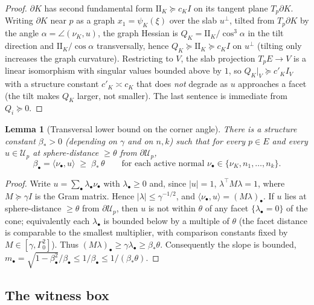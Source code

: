 \documentclass[11pt]{article}
\newtheorem{lemma}[theorem]{Lemma}
\begin{document}
\begin{proof}
$\partial K$ has second fundamental form $\mathrm{I\!I}_K\succeq c_K I$ on its
tangent plane $T_p\partial K$.  Writing $\partial K$ near $p$ as a graph
$x_1=\psi_K(\xi)$ over the slab $u^\perp$, tilted from $T_p\partial K$ by the
angle $\alpha=\angle(\nu_K,u)$, the graph Hessian is
$Q_K=\mathrm{I\!I}_K/\cos^3\!\alpha$ in the tilt direction and
$\mathrm{I\!I}_K/\cos\alpha$ transversally, hence $Q_K\succeq\mathrm{I\!I}_K
\succeq c_K I$ on $u^\perp$ (tilting only increases the graph curvature).
Restricting to $V$, the slab projection $T_pE\to V$ is a linear isomorphism with
singular values bounded above by $1$, so $Q_K|_V\succeq c'_K I_V$ with a
structure constant $c'_K\asymp c_K$ that does \emph{not} degrade as $u$
approaches a facet (the tilt makes $Q_K$ larger, not smaller).  The last
sentence is immediate from $Q_i\succeq0$.
\end{proof}

\begin{lemma}[Transversal lower bound on the corner angle]\label{lem:angle}
There is a structure constant $\beta_*>0$ (depending on $\gamma$ and on $n,k$)
such that for every $p\in E$ and every $u\in\mathcal U_p$ at sphere-distance
$\ge\theta$ from $\partial\mathcal U_p$,
\[
\beta_\bullet=\langle\nu_\bullet,u\rangle\;\ge\;\beta_*\,\theta
\qquad\text{for each active normal }\nu_\bullet\in\{\nu_K,n_1,\dots,n_k\}.
\]
\end{lemma}

\begin{proof}
Write $u=\sum_\bullet\lambda_\bullet\nu_\bullet$ with $\lambda_\bullet\ge0$ and,
since $|u|=1$, $\lambda^\top M\lambda=1$, where $M\succeq\gamma I$ is the Gram
matrix.  Hence $|\lambda|\le\gamma^{-1/2}$, and
$\langle\nu_\bullet,u\rangle=(M\lambda)_\bullet$.  If $u$ lies at
sphere-distance $\ge\theta$ from $\partial\mathcal U_p$, then $u$ is not within
$\theta$ of any facet $\{\lambda_\bullet=0\}$ of the cone; equivalently each
$\lambda_\bullet$ is bounded below by a multiple of $\theta$ (the facet
distance is comparable to the smallest multiplier, with comparison constants
fixed by $M\in[\gamma,\Gamma_0^2]$).  Thus
$(M\lambda)_\bullet\ge\gamma\lambda_\bullet\ge\beta_*\theta$.  Consequently the
slope is bounded, $m_\bullet=\sqrt{1-\beta_\bullet^2}/\beta_\bullet\le
1/\beta_\bullet\le1/(\beta_*\theta)$.
\end{proof}

\subsection{The witness box}\label{ss:box}
\end{document}
